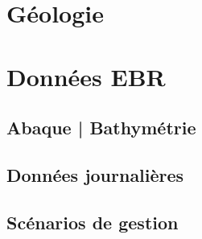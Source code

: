 \section{Géologie}
\label{sec:geologie}

\section{Données EBR}
\label{sec:donnees_ebr}

\subsection{Abaque | Bathymétrie}
\label{sec:abaque_bathymetrie}

\subsection{Données journalières}
\label{sec:donnees_journalieres}

\subsection{Scénarios de gestion}
\label{sec:scenarios_de_gestion}


